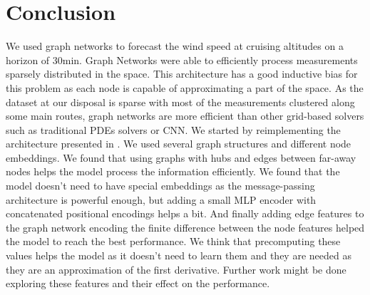 \documentclass[a4paper,10pt]{article}
\begin{document}
\section{Conclusion}
We used graph networks to forecast the wind speed at cruising altitudes on a horizon of 30min. Graph Networks were able to efficiently process measurements sparsely distributed in the space. This architecture has a good inductive bias for this problem as each node is capable of approximating a part of the space. As the dataset at our disposal is sparse with most of the measurements clustered along some main routes, graph networks are more efficient than other grid-based solvers such as traditional PDEs solvers or CNN. We started by reimplementing the architecture presented in \cite{alet2019gen}. We used several graph structures and different node embeddings. We found that using graphs with hubs and edges between far-away nodes helps the model process the information efficiently. We found that the model doesn't need to have special embeddings as the message-passing architecture is powerful enough, but adding a small MLP encoder with concatenated positional encodings helps a bit. And finally adding edge features to the graph network encoding the finite difference between the node features helped the model to reach the best performance. We think that precomputing these values helps the model as it doesn't need to learn them and they are needed as they are an approximation of the first derivative. Further work might be done exploring these features and their effect on the performance.




\end{document}
